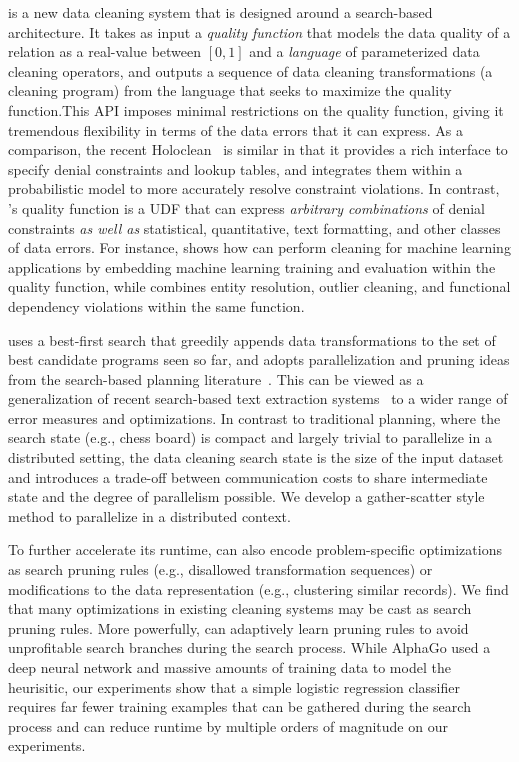 \sys is a new data cleaning system that is designed around a search-based architecture. It takes as input a {\it quality function} that models the data quality of a relation as a real-value between $[0,1]$ and a {\it language} of parameterized data cleaning operators, and outputs a sequence of data cleaning transformations (a cleaning program) from the language that seeks to maximize the quality function.This API imposes minimal restrictions on the quality function, giving it tremendous flexibility in terms of the data errors that it can express.   As a comparison, the recent Holoclean~\cite{holoclean} is similar in that it provides a rich interface to specify denial constraints and lookup tables, and integrates them within a probabilistic model to more accurately resolve constraint violations.  In contrast, \sys's quality function is a UDF that can express {\it arbitrary combinations} of denial constraints {\it as well as} statistical, quantitative, text formatting, and other classes of data errors.  For instance,  shows how \sys can perform cleaning for machine learning applications by embedding machine learning training and evaluation within the quality function, while  combines entity resolution, outlier cleaning, and functional dependency violations within the same function.  

\sys uses a best-first search that greedily appends data transformations to the set of best candidate programs seen so far, and adopts parallelization and pruning ideas from the search-based planning literature~\cite{silver2016mastering}.  This can be viewed as a generalization of recent search-based text extraction systems~\cite{jin2017foofah} to a wider range of error measures and optimizations.    In contrast to traditional planning, where the search state (e.g., chess board) is compact and largely trivial to parallelize in a distributed setting, the data cleaning search state is the size of the input dataset and introduces a trade-off between communication costs to share intermediate state and the degree of parallelism possible.  We develop a gather-scatter style method to parallelize \sys in a distributed context. 

To further accelerate its runtime, \sys can also encode problem-specific optimizations as search pruning rules (e.g., disallowed transformation sequences) or modifications to the data representation (e.g., clustering similar records).  We find that many optimizations in existing cleaning systems may be cast as search pruning rules.
More powerfully, \sys can adaptively learn pruning rules to avoid unprofitable search branches during the search process. 
While AlphaGo used a deep neural network and massive amounts of training data to model the heurisitic, our experiments show that a simple logistic regression classifier requires far fewer training examples that can be gathered during the search process and can reduce runtime by multiple orders of magnitude on our experiments. 


